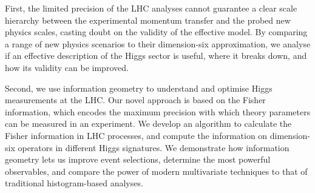 First, the limited precision of the LHC analyses cannot guarantee a
clear scale hierarchy between the experimental momentum transfer and
the probed new physics scales, casting doubt on the validity of the
effective model. By comparing a range of new physics scenarios to
their dimension-six approximation, we analyse if an effective
description of the Higgs sector is useful, where it breaks down, and
how its validity can be improved.

Second, we use information geometry to understand and optimise Higgs
measurements at the LHC. Our novel approach is based on the Fisher
information, which encodes the maximum precision with which theory
parameters can be measured in an experiment. We develop an algorithm
to calculate the Fisher information in LHC processes, and compute the
information on dimension-six operators in different Higgs signatures.
We demonstrate how information geometry lets us improve event
selections, determine the most powerful observables, and compare the
power of modern multivariate techniques to that of traditional
histogram-based analyses.



